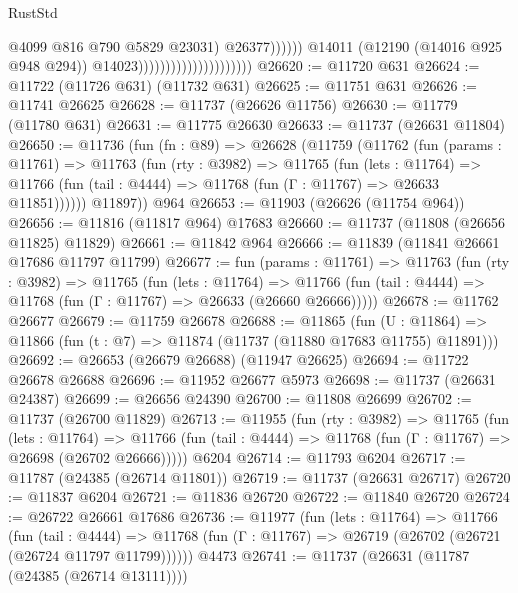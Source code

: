 \begin{lexlean}{RustStd}
\begin{coremodule}
                                                            @4099
                                                            @816
                                                            @790
                                                            @5829
                                                            @23031)
                                                          @26377))))))
                                              @14011
                                              (@12190 (@14016 @925 @948 @294))
                                              @14023)))))))))))))))))))))
@26620 := @11720 @631
@26624 := @11722 (@11726 @631) (@11732 @631)
@26625 := @11751 @631
@26626 := @11741 @26625
@26628 := @11737 (@26626 @11756)
@26630 := @11779 (@11780 @631)
@26631 := @11775 @26630
@26633 := @11737 (@26631 @11804)
@26650 := @11736
    (fun (fn : @89) =>
    @26628
      (@11759
        (@11762
          (fun (params : @11761) =>
          @11763
            (fun (rty : @3982) =>
            @11765
              (fun (lets : @11764) =>
              @11766 (fun (tail : @4444) => @11768 (fun (Γ : @11767) => @26633 @11851))))))
        @11897))
    @964
@26653 := @11903 (@26626 (@11754 @964))
@26656 := @11816 (@11817 @964) @17683
@26660 := @11737 (@11808 (@26656 @11825) @11829)
@26661 := @11842 @964
@26666 := @11839 (@11841 @26661 @17686 @11797 @11799)
@26677 := fun (params : @11761) =>
  @11763
    (fun (rty : @3982) =>
    @11765
      (fun (lets : @11764) =>
      @11766 (fun (tail : @4444) => @11768 (fun (Γ : @11767) => @26633 (@26660 @26666)))))
@26678 := @11762 @26677
@26679 := @11759 @26678
@26688 := @11865
    (fun (U : @11864) => @11866 (fun (t : @7) => @11874 (@11737 (@11880 @17683 @11755) @11891)))
@26692 := @26653 (@26679 @26688) (@11947 @26625)
@26694 := @11722 @26678 @26688
@26696 := @11952 @26677 @5973
@26698 := @11737 (@26631 @24387)
@26699 := @26656 @24390
@26700 := @11808 @26699
@26702 := @11737 (@26700 @11829)
@26713 := @11955
    (fun (rty : @3982) =>
    @11765
      (fun (lets : @11764) =>
      @11766 (fun (tail : @4444) => @11768 (fun (Γ : @11767) => @26698 (@26702 @26666)))))
    @6204
@26714 := @11793 @6204
@26717 := @11787 (@24385 (@26714 @11801))
@26719 := @11737 (@26631 @26717)
@26720 := @11837 @6204
@26721 := @11836 @26720
@26722 := @11840 @26720
@26724 := @26722 @26661 @17686
@26736 := @11977
    (fun (lets : @11764) =>
    @11766
      (fun (tail : @4444) =>
      @11768 (fun (Γ : @11767) => @26719 (@26702 (@26721 (@26724 @11797 @11799))))))
    @4473
@26741 := @11737 (@26631 (@11787 (@24385 (@26714 @13111))))

\end{coremodule}
\end{lexlean}
